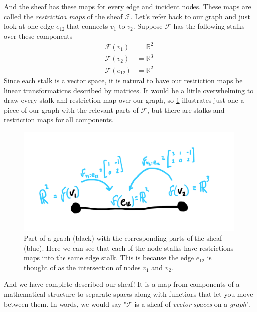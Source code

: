 \documentclass{tufte-handout}
\newcommand{\F}{\mathcal{F}}
\newcommand{\R}{\mathbb{R}}
\begin{document}
And the sheaf has these maps for every edge and incident nodes. These maps are called the \emph{restriction maps}%
of the sheaf $\F$. Let's refer back to our graph and just look at one edge $e_{12}$ that connects $v_1$ to $v_2$. Suppose $\F$ has the following stalks over these components
\begin{align*}
    \F(v_1) &= \R^2 \\
    \F(v_2) &= \R^3 \\
    \F(e_{12}) &= \R^2
\end{align*}
Since each stalk is a vector space, it is natural to have our restriction maps be linear transformations described by matrices. It would be a little overwhelming to draw every stalk and restriction map over our graph, so \cref{fig:sheafassignspace} illustrates just one a piece of our graph with the relevant parts of $\F$, but there are stalks and restriction maps for all components.

\begin{figure}[h!]
    \centering
    \includegraphics{SHEAFonGRAPH.png}
    \caption{Part of a graph (black) with the corresponding parts of the sheaf (blue). Here we can see that each of the node stalks have restrictions maps into the same edge stalk. This is because the edge $e_{12}$ is thought of as the intersection of nodes $v_1$ and $v_2$.}
    \label{fig:sheafassignspace}
\end{figure}

And we have complete described our sheaf! It is a map from components of a mathematical structure to separate spaces along with functions that let you move between them. In words, we would say "$\F$ is a sheaf of \emph{vector spaces} on a \emph{graph}".
\end{document}
